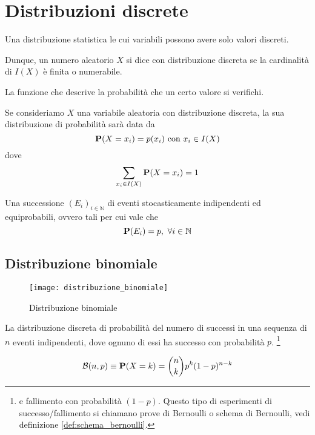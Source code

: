 \chapter{Distribuzioni discrete}
\begin{definition}\label{def:distribuzione_discreta}
  Una distribuzione statistica le cui variabili possono avere solo valori discreti.

  Dunque, un numero aleatorio \( X \) si dice con distribuzione discreta se la cardinalità di \( I(X) \) è finita o numerabile.
\end{definition}
\begin{definition}\label{def:distribuzione_di_probabilita}
  La funzione che descrive la probabilità che un certo valore si verifichi.

  Se consideriamo \( X \) una variabile aleatoria con distribuzione discreta, la sua distribuzione di probabilità sarà data da
  \[ \mathbf{P}(X = x_i) = p(x_i) \text{ con } x_i \in I(X) \]
  dove
  \[ \sum_{x_i \in I(X)} \mathbf{P}(X = x_i) = 1 \]
\end{definition}

\begin{definition}\label{def:schema_bernoulli}
  Una successione \( (E_i)_{i \in \mathbb{N}} \) di eventi stocasticamente indipendenti ed equiprobabili, ovvero tali per cui vale che
  \[ \mathbf{P}(E_i) = p, ~ \forall i \in \mathbb{N} \]
\end{definition}

\section{Distribuzione binomiale} %
\begin{figure*}
  \texttt{[image: distribuzione\_binomiale]}
  \caption{Distribuzione binomiale}
\end{figure*}

\begin{definition}
  \label{def:distribuzione_binomiale}
  La distribuzione discreta di probabilità del numero di successi in una sequenza di \( n \) eventi indipendenti, dove ognuno di essi ha successo con probabilità \( p \).
  \footnote{e fallimento con probabilità \( (1-p) \). Questo tipo di esperimenti di successo/fallimento si chiamano prove di Bernoulli o schema di Bernoulli, vedi definizione \ref{def:schema_bernoulli}.}

  \[ \mathcal{B}(n, p) \equiv \mathbf{P}(X = k) = \binom{n}{k} p^k (1-p)^{n-k} \]
\end{definition}


